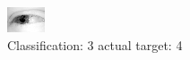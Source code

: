 \begin{figure}[h!]
\begin{center}
\includegraphics[width=0.60\columnwidth]{figures/ID2452_class_3_target_4.png}
\end{center}
\caption{ Classification: 3 actual target: 4}
\label{fig:ID2452_class_3_target_4}
\end{figure}
